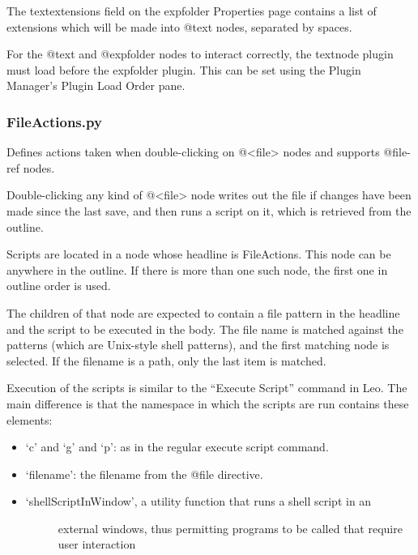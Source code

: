 \documentclass[a4paper,10pt,english]{sphinxmanual}
\begin{document}
The textextensions field on the expfolder Properties page contains a list of
extensions which will be made into @text nodes, separated by spaces.

For the @text and @expfolder nodes to interact correctly, the textnode plugin
must load before the expfolder plugin. This can be set using the Plugin
Manager's Plugin Load Order pane.


\subsubsection{FileActions.py}
\label{plugins:fileactions-py}
Defines actions taken when double-clicking on @\textless{}file\textgreater{} nodes and supports
@file-ref nodes.

Double-clicking any kind of @\textless{}file\textgreater{} node writes out the file if changes have
been made since the last save, and then runs a script on it, which is retrieved
from the outline.

Scripts are located in a node whose headline is FileActions. This node can be
anywhere in the outline. If there is more than one such node, the first one in
outline order is used.

The children of that node are expected to contain a file pattern in the headline
and the script to be executed in the body. The file name is matched against the
patterns (which are Unix-style shell patterns), and the first matching node is
selected. If the filename is a path, only the last item is matched.

Execution of the scripts is similar to the ``Execute Script''
command in Leo. The main difference is that the namespace
in which the scripts are run contains these elements:
\begin{itemize}
\item {} 
`c' and `g' and `p': as in the regular execute script command.

\item {} 
`filename': the filename from the @file directive.

\item {} \begin{description}
\item[{`shellScriptInWindow', a utility function that runs a shell script in an}] \leavevmode
external windows, thus permitting programs to be called that require user
interaction

\end{description}

\end{itemize}
\end{document}
